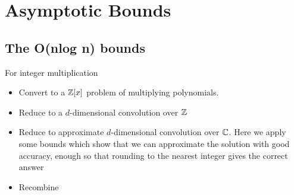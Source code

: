 \chapter{Asymptotic Bounds}\label{ch:asymptotic-bounds}

\section{The O(nlog n) bounds}
\label{sec:nlogn}

For integer multiplication

\begin{itemize}
\item Convert to a ${\mathbb Z}[x]$ problem of multiplying polynomials.
\item Reduce to a $d$-dimensional convolution over ${\mathbb Z}$
\item Reduce to approximate $d$-dimensional convolution over ${\mathbb C}$. Here we apply some bounds which show that we can approximate the solution with good accuracy, enough so that rounding to the nearest integer gives the correct answer
\item Recombine
\end{itemize}


